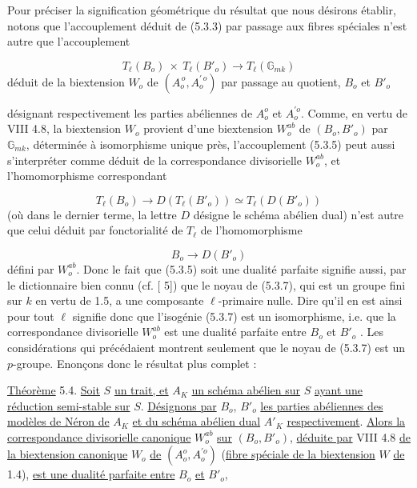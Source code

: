 Pour préciser la signification géométrique du résultat que nous désirons établir, notons que l'accouplement déduit de (5.3.3) par passage aux fibres spéciales n'est autre que l'accouplement

\begin{equation}\tag{5.3.5}
T_\ell(B_o) \ \times \ T_\ell(B'_o) \longrightarrow T_\ell(\mathbb{G}_{mk})
\end{equation}
déduit de la biextension $W_o$ de $(A_o^{\,o}, A_o^{\prime\,o})$ par passage au quotient, $B_o$ et $B'_o$



désignant respectivement les parties abéliennes de $A_o^o$ et $A_o^{\prime o}$. Comme, en vertu de VIII 4.8, la biextension $W_o$ provient d'une biextension $W_o^{ab}$ de $(B_o,B'_o)$ par $\mathbb{G}_{mk}$, déterminée à isomorphisme unique près, l'accouplement (5.3.5) peut aussi s'interpréter comme déduit de la correspondance divisorielle $W_o^{ab}$, et l'homomorphisme correspondant

\begin{equation}\tag{5.3.6}
T_\ell(B_o) \longrightarrow D(T_\ell(B'_o)) \simeq T_\ell(D(B'_o))
\end{equation}
(où dans le dernier terme, la lettre $D$ désigne le schéma abélien dual) n'est autre que celui déduit par fonctorialité de $T_\ell$ de l'homomorphisme

\begin{equation}\tag{5.3.7}
B_o \longrightarrow D(B'_o)
\end{equation}
défini par $W_o^{ab}$. Donc le fait que (5.3.5) soit une dualité parfaite signifie aussi, par le dictionnaire bien connu (cf. [ 5]) que le noyau de (5.3.7), qui est un groupe fini sur $k$ en vertu de 1.5, a une composante $\ell$-primaire nulle. Dire qu'il en est ainsi pour tout $\ell$ signifie donc que l'isogénie (5.3.7) est un isomorphisme, i.e. que la correspondance divisorielle $W_o^{ab}$ est une dualité parfaite entre $B_o$ et $B'_o$ . Les considérations qui précédaient montrent seulement que le noyau de (5.3.7) est un $p$-groupe. Enonçons donc le résultat plus complet :

\underline{Théorème} 5.4. \underline{Soit} $S$ \underline{un trait, et} $A_K$ \underline{un schéma abélien sur} $S$ \underline{ayant une réduction semi-stable sur} $S$. \underline{Désignons par} $B_o$, $B'_o$ \underline{les parties abéliennes des modèles de Néron de} $A_K$ \underline{et du schéma abélien dual} $A'_K$ \underline{respectivement}. \underline{Alors la correspondance divisorielle canonique} $W_o^{ab}$ \underline{sur} $(B_o,B'_o)$, \underline{déduite par} VIII 4.8 \underline{de la biextension canonique} $W_o$ \underline{de} $(A_o^o,A_o^{\prime o})$ (\underline{fibre spéciale de la biextension} $W$ \underline{de} 1.4), \underline{est une dualité parfaite entre} $B_o$ \underline{et} $B'_o$,


